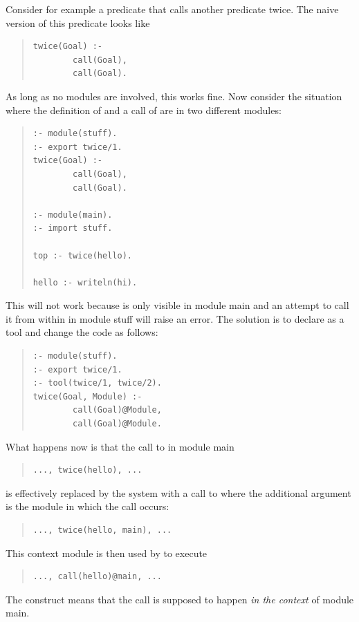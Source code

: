 Consider for example a predicate that calls another predicate twice.
The naive version of this predicate looks like
\begin{quote}
\begin{verbatim}
twice(Goal) :-
        call(Goal),
        call(Goal).
\end{verbatim}
\end{quote}
As long as no modules are involved, this works fine.
Now consider the situation where the definition of  and a
call of  are in two different modules:
\begin{quote}
\begin{verbatim}
:- module(stuff).
:- export twice/1.
twice(Goal) :-
        call(Goal),
        call(Goal).

:- module(main).
:- import stuff.

top :- twice(hello).

hello :- writeln(hi).
\end{verbatim}
\end{quote}
This will not work because  is only visible in module main
and an attempt to call it from within  in module stuff will
raise an error. The solution is to declare  as a tool and
change the code as follows:
\begin{quote}
\begin{verbatim}
:- module(stuff).
:- export twice/1.
:- tool(twice/1, twice/2).
twice(Goal, Module) :-
        call(Goal)@Module,
        call(Goal)@Module.
\end{verbatim}
\end{quote}
What happens now is that the call to  in module main
\begin{quote}
\begin{verbatim}
..., twice(hello), ...
\end{verbatim}
\end{quote}
is effectively replaced by the system with a call to  where
the additional argument is the module in which the call occurs:
\begin{quote}
\begin{verbatim}
..., twice(hello, main), ...
\end{verbatim}
\end{quote}
This context module is then used by  to execute
\begin{quote}
\begin{verbatim}
..., call(hello)@main, ...
\end{verbatim}
\end{quote}
The
%
 construct means that the call is supposed
to happen \emph{in the context} of module main.


